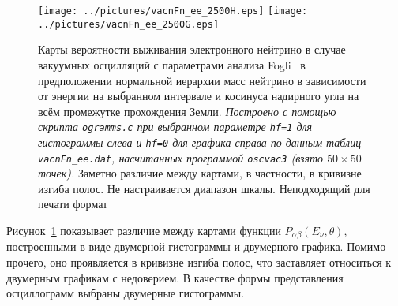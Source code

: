 \begin{figure}[!ht]
\texttt{[image: ../pictures/vacnFn\_ee\_2500H.eps]}
\texttt{[image: ../pictures/vacnFn\_ee\_2500G.eps]}
\caption{Карты вероятности выживания электронного нейтрино в случае вакуумных осцилляций с параметрами анализа Fogli~\cite{Fogli:2012ua} в предположении нормальной иерархии масс нейтрино в зависимости от энергии на выбранном интервале и косинуса надирного угла на всём промежутке прохождения Земли. \textit{Построено с помощью скрипта \texttt{ogramms.c} при выбранном параметре \texttt{hf=1} для гистограммы слева и \texttt{hf=0} для графика справа по данным таблиц \texttt{vacnFn\_ee.dat}, насчитанных программой \texttt{oscvac3} (взято $50\times50$ точек).} Заметно различие между картами, в частности, {\color{red}в кривизне изгиба полос}. {\color{red}Не настраивается диапазон шкалы.} {\color{magenta}Неподходящий для печати формат}}
\label{vacnFn_ee_HvsG}
\end{figure}

Рисунок~\ref{vacnFn_ee_HvsG} показывает различие между картами функции $P_{\alpha\beta}(E_{\nu},\theta)$, построенными в виде двумерной гистограммы и двумерного графика. Помимо прочего, оно проявляется {\color{red}в кривизне изгиба полос}, что заставляет относиться к двумерным графикам с недоверием. {\color{blue}В качестве формы представления осциллограмм выбраны двумерные гистограммы.}

